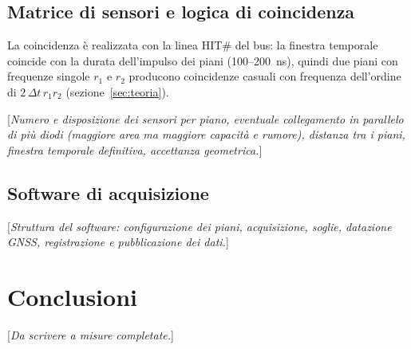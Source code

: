 \documentclass[11pt,a4paper]{article}
\newcommand{\dadefinire}[1]{\textcolor{red!70!black}{[\emph{#1}]}}
\begin{document}
\subsection{Matrice di sensori e logica di coincidenza}

La coincidenza è realizzata con la linea HIT\# del bus: la finestra temporale coincide con la durata dell'impulso dei piani (100--\SI{200}{\nano\second}), quindi due piani con frequenze singole $r_1$ e $r_2$ producono coincidenze casuali con frequenza dell'ordine di $2\,\Delta t\,r_1 r_2$ (sezione~\ref{sec:teoria}).

\dadefinire{Numero e disposizione dei sensori per piano, eventuale collegamento in parallelo di più diodi (maggiore area ma maggiore capacità e rumore), distanza tra i piani, finestra temporale definitiva, accettanza geometrica.}

\subsection{Software di acquisizione}

\dadefinire{Struttura del software: configurazione dei piani, acquisizione, soglie, datazione GNSS, registrazione e pubblicazione dei dati.}

\section{Conclusioni}

\dadefinire{Da scrivere a misure completate.}



\end{document}
